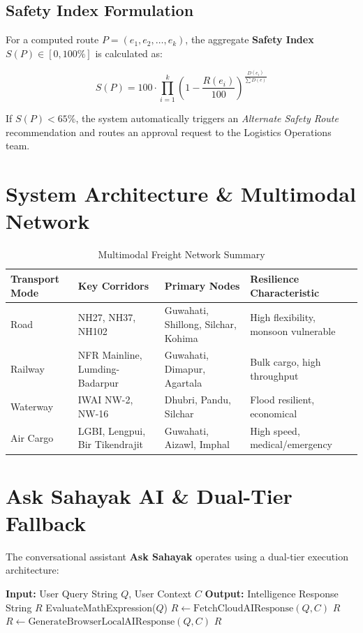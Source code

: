 \documentclass[11pt,a4paper]{article}
\begin{document}
\subsection{Safety Index Formulation}
For a computed route $P = (e_1, e_2, \dots, e_k)$, the aggregate \textbf{Safety Index} $S(P) \in [0, 100\%]$ is calculated as:

\begin{equation}
    S(P) = 100 \cdot \prod_{i=1}^{k} \left( 1 - \frac{R(e_i)}{100} \right)^{\frac{D(e_i)}{\sum D(e)}}
\end{equation}

If $S(P) < 65\%$, the system automatically triggers an \textit{Alternate Safety Route} recommendation and routes an approval request to the Logistics Operations team.

\section{System Architecture \& Multimodal Network}

\begin{table}[h]
\centering
\caption{Multimodal Freight Network Summary}
\label{tab:network}
\begin{tabular}{llll}
\toprule
\textbf{Transport Mode} & \textbf{Key Corridors} & \textbf{Primary Nodes} & \textbf{Resilience Characteristic} \\
\midrule
Road & NH27, NH37, NH102 & Guwahati, Shillong, Silchar, Kohima & High flexibility, monsoon vulnerable \\
Railway & NFR Mainline, Lumding-Badarpur & Guwahati, Dimapur, Agartala & Bulk cargo, high throughput \\
Waterway & IWAI NW-2, NW-16 & Dhubri, Pandu, Silchar & Flood resilient, economical \\
Air Cargo & LGBI, Lengpui, Bir Tikendrajit & Guwahati, Aizawl, Imphal & High speed, medical/emergency \\
\bottomrule
\end{tabular}
\end{table}

\section{Ask Sahayak AI \& Dual-Tier Fallback}
The conversational assistant \textbf{Ask Sahayak} operates using a dual-tier execution architecture:

\begin{algorithm}[H]
\caption{Ask Sahayak Query Processor}
\begin{algorithmic}[1]
\State \textbf{Input:} User Query String $Q$, User Context $C$
\State \textbf{Output:} Intelligence Response String $R$
    \State \Return EvaluateMathExpression($Q$)
\EndIf
\Try
    \State $R \gets \text{FetchCloudAIResponse}(Q, C)$
    \State \Return $R$
    \State $R \gets \text{GenerateBrowserLocalAIResponse}(Q, C)$
    \State \Return $R$
\EndTry
\end{algorithmic}
\end{algorithm}
\end{document}
